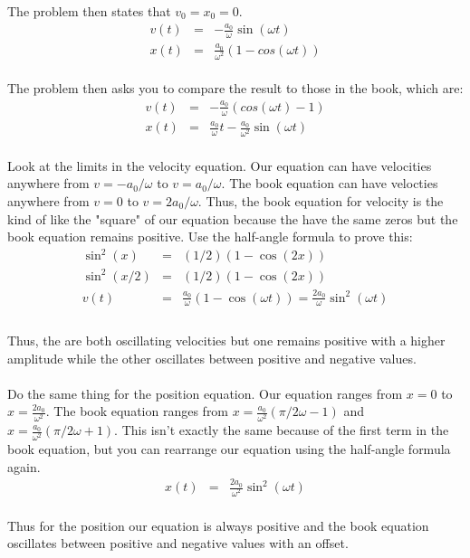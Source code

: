 \documentclass[11pt]{amsart}
\begin{document}
The problem then states that $v_{0}=x_{0}=0$. \\ 
\begin{eqnarray*}
v(t) &=& -\frac{a_{0}}{\omega}\sin(\omega{}t) \\
x(t) &=& \frac{a_{0}}{\omega^{2}}(1-cos(\omega{}t)) 
\end{eqnarray*} \\
The problem then asks you to compare the result to those in the book, which are: \\ 
\begin{eqnarray*} 
v(t) &=& -\frac{a_{0}}{\omega}(cos(\omega{}t)-1) \\
x(t) &=& \frac{a_{0}}{\omega}t - \frac{a_{0}}{\omega^{2}}\sin(\omega{}t) 
\end{eqnarray*} \\
Look at the limits in the velocity equation. Our equation can have velocities anywhere from $v=-a_{0}/\omega$ to $v=a_{0}/\omega$. The book equation can have  velocties anywhere from $v=0$ to $v=2a_{0}/\omega$. Thus, the book equation for velocity is the kind of like the "square" of our equation because the have the same zeros but the book equation remains positive. Use the half-angle formula to prove this: \\
\begin{eqnarray*}
\sin^{2}(x) &=& (1/2)(1-\cos(2x)) \\
\sin^{2}(x/2) &=& (1/2)(1-\cos(2x)) \\ 
v(t) &=& \frac{a_{0}}{\omega}(1-\cos(\omega{}t)) = \frac{2a_{0}}{\omega}\sin^{2}(\omega{}t) \\ 
\end{eqnarray*} \\
Thus, the are both oscillating velocities but one remains positive with a higher amplitude while the other oscillates between  positive and negative values. \\ \\
Do the same thing for the position equation. Our equation ranges from $x=0$ to $x=\frac{2a_{0}}{\omega^{2}}$. The book equation ranges from $x=\frac{a_{0}}{\omega^{2}}(\pi/2\omega-1)$ and $x=\frac{a_{0}}{\omega^{2}}(\pi/2\omega+1)$. This isn't exactly the same because of the first term in the book equation, but you can rearrange our equation using the half-angle formula again.\\ 
\begin{eqnarray*} 
x(t) &=& \frac{2a_{0}}{\omega^{2}}\sin^{2}(\omega{}t) 
\end{eqnarray*} \\
Thus for the position our equation is always positive and the book equation oscillates between positive and negative values with an offset. \\ 
\end{document}
